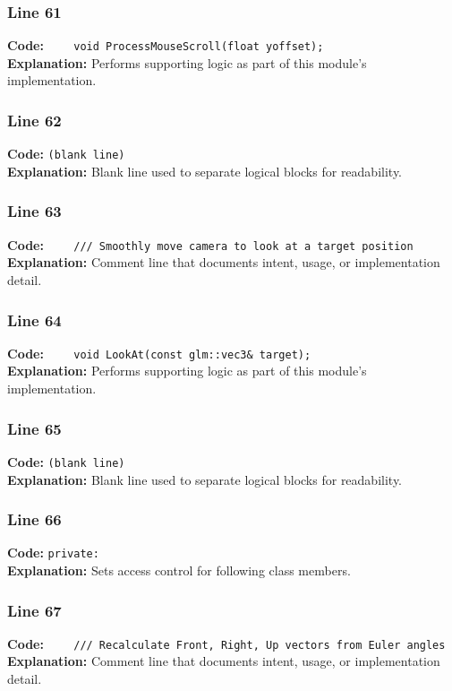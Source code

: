 \documentclass[11pt,a4paper]{article}
\begin{document}
\subsubsection*{Line 61}
\textbf{Code:} \verb|    void ProcessMouseScroll(float yoffset);|\\
\textbf{Explanation:} Performs supporting logic as part of this module's implementation.

\subsubsection*{Line 62}
\textbf{Code:} \texttt{(blank line)}\\
\textbf{Explanation:} Blank line used to separate logical blocks for readability.

\subsubsection*{Line 63}
\textbf{Code:} \verb|    /// Smoothly move camera to look at a target position|\\
\textbf{Explanation:} Comment line that documents intent, usage, or implementation detail.

\subsubsection*{Line 64}
\textbf{Code:} \verb|    void LookAt(const glm::vec3& target);|\\
\textbf{Explanation:} Performs supporting logic as part of this module's implementation.

\subsubsection*{Line 65}
\textbf{Code:} \texttt{(blank line)}\\
\textbf{Explanation:} Blank line used to separate logical blocks for readability.

\subsubsection*{Line 66}
\textbf{Code:} \verb|private:|\\
\textbf{Explanation:} Sets access control for following class members.

\subsubsection*{Line 67}
\textbf{Code:} \verb|    /// Recalculate Front, Right, Up vectors from Euler angles|\\
\textbf{Explanation:} Comment line that documents intent, usage, or implementation detail.
\end{document}
